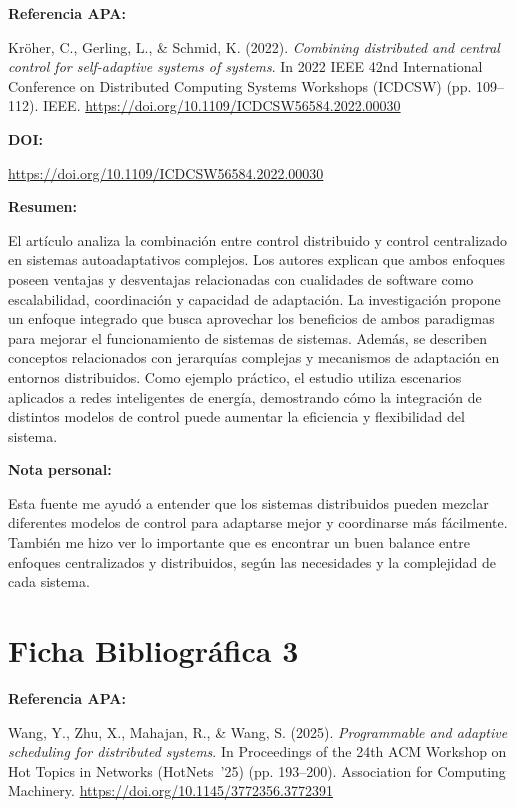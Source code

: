 \documentclass[12pt]{article}
\begin{document}
\textbf{Referencia APA:}

Kröher, C., Gerling, L., \& Schmid, K. (2022). \textit{Combining distributed and central control for self-adaptive systems of systems}. In 2022 IEEE 42nd International Conference on Distributed Computing Systems Workshops (ICDCSW) (pp. 109--112). IEEE. \url{https://doi.org/10.1109/ICDCSW56584.2022.00030}

\vspace{0.3cm}

\textbf{DOI:}

\url{https://doi.org/10.1109/ICDCSW56584.2022.00030}

\vspace{0.3cm}

\textbf{Resumen:}

El artículo analiza la combinación entre control distribuido y control centralizado en sistemas autoadaptativos complejos. Los autores explican que ambos enfoques poseen ventajas y desventajas relacionadas con cualidades de software como escalabilidad, coordinación y capacidad de adaptación. La investigación propone un enfoque integrado que busca aprovechar los beneficios de ambos paradigmas para mejorar el funcionamiento de sistemas de sistemas. Además, se describen conceptos relacionados con jerarquías complejas y mecanismos de adaptación en entornos distribuidos. Como ejemplo práctico, el estudio utiliza escenarios aplicados a redes inteligentes de energía, demostrando cómo la integración de distintos modelos de control puede aumentar la eficiencia y flexibilidad del sistema.

\vspace{0.3cm}

\textbf{Nota personal:}

Esta fuente me ayudó a entender que los sistemas distribuidos pueden mezclar diferentes modelos de control para adaptarse mejor y coordinarse más fácilmente. También me hizo ver lo importante que es encontrar un buen balance entre enfoques centralizados y distribuidos, según las necesidades y la complejidad de cada sistema.

\newpage

\section{Ficha Bibliográfica 3}

\textbf{Referencia APA:}

Wang, Y., Zhu, X., Mahajan, R., \& Wang, S. (2025). \textit{Programmable and adaptive scheduling for distributed systems}. In Proceedings of the 24th ACM Workshop on Hot Topics in Networks (HotNets~'25) (pp. 193--200). Association for Computing Machinery. \url{https://doi.org/10.1145/3772356.3772391}
\end{document}
